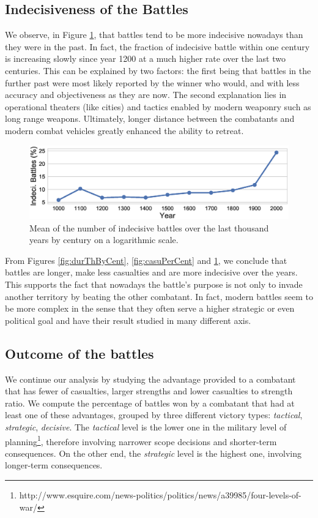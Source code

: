 \subsection{Indecisiveness of the Battles}

We observe, in Figure \ref{fig:IndecBattles}, that battles tend to be more indecisive nowadays than they were in the past. In fact, the fraction of indecisive battle within one century is increasing slowly since year 1200 at a much higher rate over the last two centuries. This can be explained by two factors: the first being that battles in the further past were most likely reported by the winner who would, and with less accuracy and objectiveness as they are now. The second explanation lies in operational theaters (like cities) and tactics enabled by modern weaponry such as long range weapons. Ultimately, longer distance between the combatants and modern combat vehicles greatly enhanced the ability to retreat.

 \begin{figure}[h]
	\centering	\includegraphics[width=\linewidth]{figures/indThByCent}
	\caption{Mean of the number of indecisive battles over the last thousand years by century on a logarithmic scale.}\label{fig:IndecBattles}
	\centering
\end{figure}

From Figures \ref{fig:durThByCent}, \ref{fig:casuPerCent} and \ref{fig:IndecBattles}, we conclude that battles are longer, make less casualties and are more indecisive over the years. This supports the fact that nowadays the battle's purpose is not only to invade another territory by beating the other combatant. In fact, modern battles seem to be more complex in the sense that they often serve a higher strategic or even political goal and have their result studied in many different axis.

\subsection{Outcome of the battles}

We continue our analysis by studying the advantage provided to a combatant that has fewer of casualties, larger strengths  and  lower casualties to strength ratio. We compute the percentage of battles won by a combatant that had at least one of these advantages, grouped by three different victory types: \textit{tactical}, \textit{strategic},  \textit{decisive}. The \textit{tactical} level is the lower one in the military level of planning\footnote{http://www.esquire.com/news-politics/politics/news/a39985/four-levels-of-war/}, therefore involving narrower scope decisions and shorter-term consequences. On the other end, the \textit{strategic} level is the highest one, involving longer-term
consequences.

